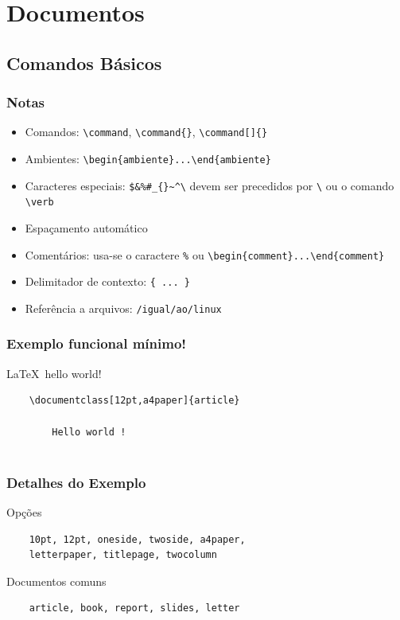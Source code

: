 \section{Documentos}

\subsection[]{Comandos Básicos}

\begin{frame}[fragile]
\frametitle{Notas}

\begin{itemize}
  \item Comandos: \verb|\command|, \verb|\command{}|, \verb|\command[]{}|
  \item Ambientes: \verb|\begin{ambiente}...\end{ambiente}|
  \item Caracteres especiais: \verb|$&%#_{}~^\| devem ser precedidos por \verb|\| ou o comando
  \verb|\verb|
  \item Espaçamento automático
  \item Comentários: usa-se o caractere \verb|%| ou \verb|\begin{comment}...\end{comment}|
  \item Delimitador de contexto: \verb|{ ... }|
  \item Referência a arquivos: \verb|/igual/ao/linux|
\end{itemize}
 
\end{frame}


\begin{frame}[fragile]
\frametitle{Exemplo funcional mínimo!}

\begin{block}{\LaTeX~hello world!}
\begin{verbatim}
	\documentclass[12pt,a4paper]{article}
	
		Hello world !
	
\end{verbatim}
\end{block}
 
\end{frame}

\begin{frame}[fragile]
\frametitle{Detalhes do Exemplo}

\begin{block}{Opções}
\begin{verbatim} 
	10pt, 12pt, oneside, twoside, a4paper, 
	letterpaper, titlepage, twocolumn
\end{verbatim}
\end{block}
 \begin{block}{Documentos comuns}
\begin{verbatim} 
	article, book, report, slides, letter
\end{verbatim}
\end{block}
\end{frame}


